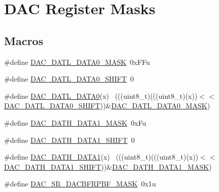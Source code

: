 \hypertarget{group___d_a_c___register___masks}{}\section{D\+AC Register Masks}
\label{group___d_a_c___register___masks}
\subsection*{Macros}
\begin{DoxyCompactItemize}
\item 
\#define \hyperlink{group___d_a_c___register___masks_ga06d752efe9ec5bab7d61ccf9c2689345}{D\+A\+C\+\_\+\+D\+A\+T\+L\+\_\+\+D\+A\+T\+A0\+\_\+\+M\+A\+SK}~0x\+F\+Fu
\item 
\#define \hyperlink{group___d_a_c___register___masks_gad9030129a0f34502c115abd36728d001}{D\+A\+C\+\_\+\+D\+A\+T\+L\+\_\+\+D\+A\+T\+A0\+\_\+\+S\+H\+I\+FT}~0
\item 
\#define \hyperlink{group___d_a_c___register___masks_gaa13ea1c66a092710827f2b587de08dbb}{D\+A\+C\+\_\+\+D\+A\+T\+L\+\_\+\+D\+A\+T\+A0}(x)                                            ~(((uint8\+\_\+t)(((uint8\+\_\+t)(x))$<$$<$\hyperlink{group___d_a_c___register___masks_gad9030129a0f34502c115abd36728d001}{D\+A\+C\+\_\+\+D\+A\+T\+L\+\_\+\+D\+A\+T\+A0\+\_\+\+S\+H\+I\+FT}))\&\hyperlink{group___d_a_c___register___masks_ga06d752efe9ec5bab7d61ccf9c2689345}{D\+A\+C\+\_\+\+D\+A\+T\+L\+\_\+\+D\+A\+T\+A0\+\_\+\+M\+A\+SK})
\item 
\#define \hyperlink{group___d_a_c___register___masks_ga98c0e999ae86d666b5d6fa8df700ba6f}{D\+A\+C\+\_\+\+D\+A\+T\+H\+\_\+\+D\+A\+T\+A1\+\_\+\+M\+A\+SK}~0x\+Fu
\item 
\#define \hyperlink{group___d_a_c___register___masks_ga0056432036b350d3839554982acfbff1}{D\+A\+C\+\_\+\+D\+A\+T\+H\+\_\+\+D\+A\+T\+A1\+\_\+\+S\+H\+I\+FT}~0
\item 
\#define \hyperlink{group___d_a_c___register___masks_gae3734e5bd7b469016b85d9ba2dd2d071}{D\+A\+C\+\_\+\+D\+A\+T\+H\+\_\+\+D\+A\+T\+A1}(x)                                            ~(((uint8\+\_\+t)(((uint8\+\_\+t)(x))$<$$<$\hyperlink{group___d_a_c___register___masks_ga0056432036b350d3839554982acfbff1}{D\+A\+C\+\_\+\+D\+A\+T\+H\+\_\+\+D\+A\+T\+A1\+\_\+\+S\+H\+I\+FT}))\&\hyperlink{group___d_a_c___register___masks_ga98c0e999ae86d666b5d6fa8df700ba6f}{D\+A\+C\+\_\+\+D\+A\+T\+H\+\_\+\+D\+A\+T\+A1\+\_\+\+M\+A\+SK})
\item 
\#define \hyperlink{group___d_a_c___register___masks_ga5af56fd75a9c5b74fe07c8f303d452aa}{D\+A\+C\+\_\+\+S\+R\+\_\+\+D\+A\+C\+B\+F\+R\+P\+B\+F\+\_\+\+M\+A\+SK}~0x1u

\end{DoxyCompactItemize}
